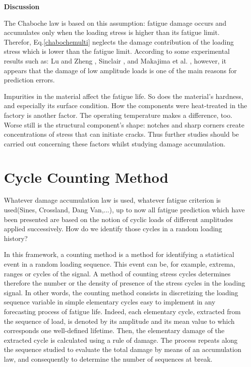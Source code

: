 \textbf{Discussion}

The Chaboche law is based on this assumption: fatigue damage occurs and accumulates only when the loading stress is higher than its fatigue limit. Therefor, Eq.\eqref{chabochemulti} neglects the damage contribution of the loading stress which is lower than the fatigue limit. According to some experimental results such as: Lu and Zheng \cite{xi2008strengthening} \cite{xi2009strengthening} \cite{xi2009changes}, Sinclair \cite{sinclair1952investigation}, and Makajima et al. \cite{nakajima2007coaxing}, however, it appears that the damage of low amplitude loads is one
of the main reasons for prediction errors. 

Impurities in the material affect the fatigue life. So does the material's hardness, and especially its surface condition. How the components were heat-treated in the factory is another factor. The operating temperature makes a difference, too. Worse still is the structural component's shape: notches and sharp corners create concentrations of stress that can initiate cracks. Thus further studies should be carried out concerning these factors whilst studying damage accumulation.

\section{Cycle Counting Method}
\label{sec:5.1}
Whatever damage accumulation law is used, whatever fatigue criterion is used(Sines, Crossland, Dang Van,...), up to now all fatigue prediction which have been presented are based on the notion of cyclic loads of different amplitudes applied successively. How do we identify those cycles in a random loading history?

In this framework, a counting method is a method for identifying a statistical event
in a random loading sequence. This event can be, for example, extrema,
ranges or cycles of the signal. A method of counting stress cycles determines
therefore the number or the density of presence of the stress cycles in the loading signal.
In other words, the counting method consists in discretizing the loading sequence
variable in simple elementary cycles easy to implement in any forecasting process
of fatigue life. Indeed, each elementary cycle, extracted from the sequence of
load, is denoted by its amplitude and its mean value to which corresponds one
well-defined lifetime. Then, the elementary damage of the extracted cycle is calculated using
a rule of damage. The process repeats along the sequence studied to evaluate
the total damage by means of an accumulation law, and consequently to determine the number of
sequences at break.

